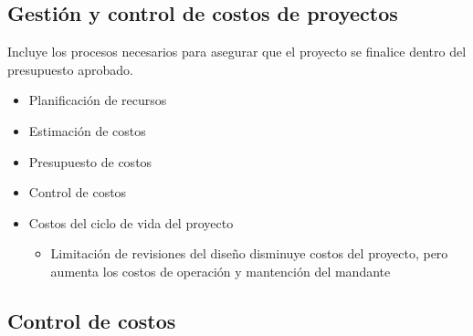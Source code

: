 \documentclass{article} %
\begin{document}
\subsection{Gestión y control de costos de proyectos}

Incluye los procesos necesarios para asegurar que el proyecto se finalice dentro del presupuesto aprobado.
\begin{itemize}[label={},left=0pt,align=parleft]
    \item \begin{highlightbox}[levelone] Planificación de recursos \end{highlightbox}
    \item \begin{highlightbox}[levelone] Estimación de costos \end{highlightbox}
    \item \begin{highlightbox}[levelone] Presupuesto de costos \end{highlightbox}
    \item \begin{highlightbox}[levelone] Control de costos \end{highlightbox}
    \item \begin{highlightbox}[levelone] Costos del ciclo de vida del proyecto \end{highlightbox}
    \begin{itemize}[label={},left=1em,align=parleft]
        \item \begin{highlightbox}[leveltwo] Limitación de revisiones del diseño disminuye costos del proyecto, pero aumenta los costos de operación y mantención del mandante \end{highlightbox}
    \end{itemize}
\end{itemize}

\subsection{Control de costos}
\end{document}
